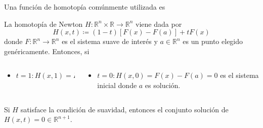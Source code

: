 \begin{frame}
	Una función de homotopía comúnmente utilizada es
	\begin{definition}
		La \alert{homotopía de Newton}
		$H\colon\mathbb{R}^{n}\times\mathbb{R}\to\mathbb{R}^{n}$ viene
		dada por
		\begin{equation}\label{eq:newtonhomotopy}
			H\left(x,t\right)\coloneqq
			\left(1-t\right)
			\left[
				F\left(x\right)-
				F\left(a\right)
				\right]+
			tF\left(x\right)
		\end{equation}
		donde
		\begin{math}
			F\colon\mathbb{R}^{n}\to\mathbb{R}^{n}
		\end{math}
		es el sistema suave de interés y $a\in\mathbb{R}^{n}$ es un punto
		elegido genéricamente.
		Entonces, si
	\end{definition}

	\begin{columns}
		\begin{column}{0.28\textwidth}
			\begin{itemize}
				\item

				      \begin{math}
					      t=1:
					      H\left(x,1\right)=
					      F\left(x\right)=
					      0.
				      \end{math}
			\end{itemize}
		\end{column}
		\begin{column}{0.68\textwidth}
			\begin{itemize}
				\item

				      \begin{math}
					      t=0:
					      H\left(x,0\right)=
					      F\left(x\right)-F\left(a\right)=
					      0
				      \end{math}
				      es el sistema inicial donde $a$ es solución.
			\end{itemize}
		\end{column}
	\end{columns}

	Si $H$ satisface la condición de suavidad, entonces el
	conjunto solución de $H\left(x,t\right)=0\in\mathbb{R}^{n+1}$.


\end{frame}
